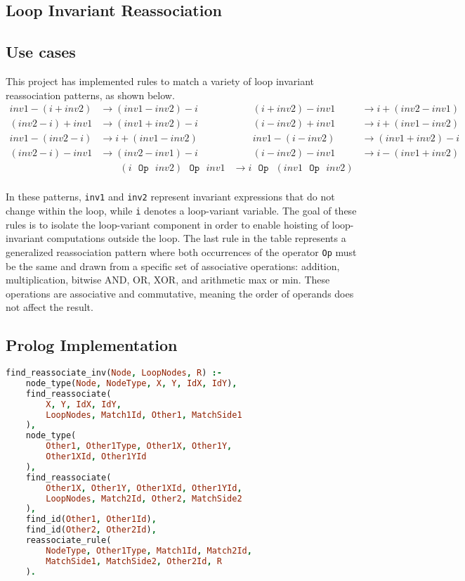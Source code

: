 \subsection{Loop Invariant Reassociation}
\subsection*{Use cases}
This project has implemented rules to match a variety of loop invariant reassociation patterns, as shown below.
\begin{align*}
    inv1 - (i + inv2)          &\rightarrow (inv1 - inv2) - i        &\qquad (i + inv2) - inv1           &\rightarrow i + (inv2 - inv1) \\
    (inv2 - i) + inv1          &\rightarrow (inv1 + inv2) - i        &\qquad (i - inv2) + inv1           &\rightarrow i + (inv1 - inv2) \\
    inv1 - (inv2 - i)          &\rightarrow i + (inv1 - inv2)        &\qquad inv1 - (i - inv2)           &\rightarrow (inv1 + inv2) - i \\
    (inv2 - i) - inv1          &\rightarrow (inv2 - inv1) - i        &\qquad (i - inv2) - inv1           &\rightarrow i - (inv1 + inv2) \\
    &\qquad  (i  \texttt{{\ }Op{\ }} inv2) \texttt{{\ }Op{\ }} inv1         &\rightarrow i \texttt{{\ }Op{\ }} (inv1 \texttt{{\ }Op{\ }} inv2) \\
\end{align*}
\vspace{-10pt}

In these patterns, \texttt{inv1} and \texttt{inv2} represent invariant expressions that do not change within the loop, while \texttt{i} denotes a loop-variant variable. The goal of these rules is to isolate the loop-variant component in order to enable hoisting of loop-invariant computations outside the loop.
The last rule in the table represents a generalized reassociation pattern where both occurrences of the operator \texttt{Op} must be the same and drawn from a specific set of associative operations: addition, multiplication, bitwise AND, OR, XOR, and arithmetic max or min. 
These operations are associative and commutative, meaning the order of operands does not affect the result.

\subsection*{Prolog Implementation}
\begin{lstlisting}[language=Prolog]
% Entry point for invariant reassociation   
find_reassociate_inv(Node, LoopNodes, R) :-
    node_type(Node, NodeType, X, Y, IdX, IdY),
    find_reassociate(
        X, Y, IdX, IdY, 
        LoopNodes, Match1Id, Other1, MatchSide1
    ),
    node_type(
        Other1, Other1Type, Other1X, Other1Y, 
        Other1XId, Other1YId
    ),
    find_reassociate(
        Other1X, Other1Y, Other1XId, Other1YId, 
        LoopNodes, Match2Id, Other2, MatchSide2
    ),
    find_id(Other1, Other1Id),
    find_id(Other2, Other2Id),
    reassociate_rule(
        NodeType, Other1Type, Match1Id, Match2Id, 
        MatchSide1, MatchSide2, Other2Id, R
    ).
\end{lstlisting}

